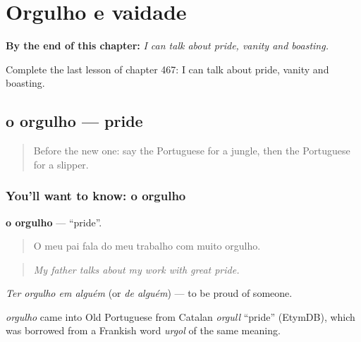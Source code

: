 
\chapter{Orgulho e vaidade}
\label{ch:pt-orgulho-e-vaidade}

\begin{chapteropening}
\textbf{By the end of this chapter:} \emph{I can talk about pride, vanity and boasting.}

Complete the last lesson of chapter 467: I can talk about pride, vanity and boasting.
\end{chapteropening}

\section[o orgulho]{o orgulho — pride}

\label{lesson:PT-C467-orgulho}



\begin{quote}
Before the new one: say the Portuguese for a jungle, then the Portuguese for a slipper.
\end{quote}

\subsection*{You'll want to know: o orgulho}
\textbf{o orgulho} — \textquotedblleft{}pride\textquotedblright{}.

\begin{quote}
O meu pai fala do meu trabalho com muito orgulho.
\end{quote}

\begin{quote}
\emph{My father talks about my work with great pride.}
\end{quote}

\emph{Ter orgulho em alguém} (or \emph{de alguém}) — to be proud of someone.

\begin{cousinweb}
\emph{orgulho} came into Old Portuguese from Catalan \emph{orgull} \textquotedblleft{}pride\textquotedblright{} (EtymDB), which was borrowed from a Frankish word \emph{urgol} of the same meaning.
\end{cousinweb}

